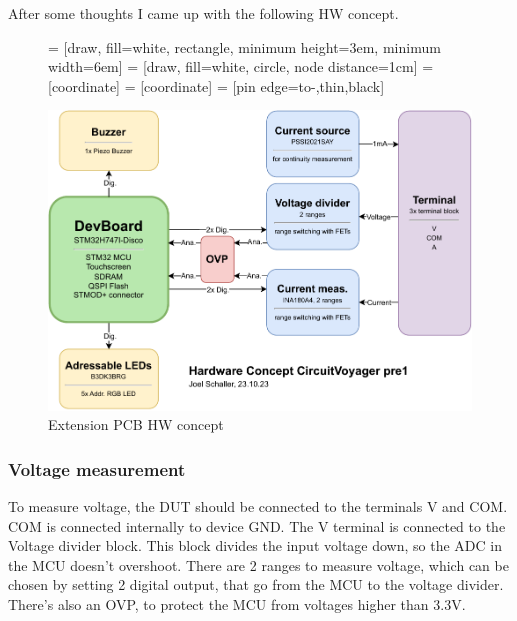After some thoughts I came up with the following HW concept.


\begin{figure}[H]
	\centering



     = [draw, fill=white, rectangle, 
    minimum height=3em, minimum width=6em]
     = [draw, fill=white, circle, node distance=1cm]
     = [coordinate]
     = [coordinate]
     = [pin edge={to-,thin,black}]

    \includegraphics[width=15cm]{Resources/Pictures/Hardware_Concept_CircuitVoyager_pre1.pdf}

    \vspace{0.2cm}

	\caption{Extension PCB HW concept}
	\label{fig:Extension PCB HW concept}
\end{figure}

\subsubsection{Voltage measurement}
To measure voltage, the DUT should be connected to the terminals V and COM. COM is connected internally to device GND. The V terminal is connected to the Voltage divider block. This block divides the input voltage down, so the ADC in the MCU doesn't overshoot. There are 2 ranges to measure voltage, which can be chosen by setting 2 digital output, that go from the MCU to the voltage divider. There's also an OVP, to protect the MCU from voltages higher than 3.3V. \cite{DMM_Video_ElectroNoobs}

